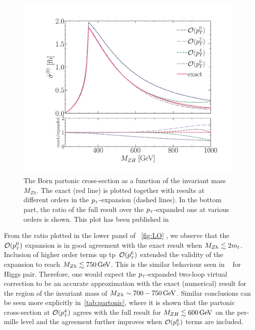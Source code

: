 \begin{figure}[t]
	\centering
	\includegraphics[width=0.8\linewidth]{./figures/LO_ptexp_ratio_1000.pdf}
	\caption{The Born partonic cross-section
		as a function of the invariant mass $M_{Zh}$.
		The exact (red line) is plotted together with results at
		different orders in the $p_{\scriptscriptstyle T}$-expansion (dashed lines). In the bottom part,
		the ratio of the full result over the $p_{\scriptscriptstyle T}$-expanded one at
		various orders is shown. This plot has been published in~\cite{Alasfar:2021ppe}}
	\label{fig:LO}
\end{figure}
From the ratio plotted in the lower panel of ~\autoref{fig:LO} , we observe that the~$\mathcal{O}(p_{\scriptscriptstyle T}^0)$ expansion is in good agreement with the exact result  when $M_{Zh}\lesssim 2m_t$. Inclusion of higher order terms up tp~$\mathcal{O}(p_{\scriptscriptstyle T}^6)$ extended the validity of the expansion to reach  $M_{Zh}\lesssim 750\,\textrm{GeV}$. This is the similar behaviour seen in ~\cite{Bonciani:2018omm} for Higgs pair.  Therefore, one would expect the $p_{\scriptscriptstyle T}$-expanded two-loop virtual correction to be an accurate approximation with the exact (numerical) result for the region of the invariant mass of  $M_{Zh}\sim 700-750\,\textrm{GeV}$. 
Similar conclusions can be seen more explicitly in~\autoref{tab:partonic}, where it is shown that the partonic cross-section
at $\mathcal{O}(p_{\scriptscriptstyle T}^4)$ agrees with the full result for
$M_{ZH} \lesssim 600 \,\textrm{GeV}$  on the per-mille level 
and the agreement further improves when $\mathcal{O}(p_{\scriptscriptstyle T}^6)$ terms are included.
